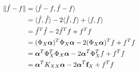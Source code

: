 \documentclass[twoside]{article} \usepackage{aistats2017}
\newcommand{\ds}[1]{{#1}}
\begin{document}
		\begin{equation}
		\begin{aligned}
			\Vert \hat{f} - f \Vert &= \langle \hat{f} - f, \hat{f} - f \rangle \\
			&= \langle \hat{f}, \hat{f} \rangle - 2 \langle \hat{f}, f \rangle + \langle f, f \rangle \\
			&=  \hat{f}^{T} \hat{f} - 2 \hat{f}^{T} f + f^{T} f \\
			&= (\Phi_{\ds{X}} \bm{\alpha})^{T} \Phi_{\ds{X}}  \bm{\alpha} - 2 (\Phi_{\ds{X}}  \bm{\alpha})^{T} f + f^{T} f \\
			&= \bm{\alpha}^{T} \Phi_{\ds{X}} ^{T} \Phi_{\ds{X}}  \bm{\alpha} - 2 \bm{\alpha}^{T} \Phi_{\ds{X}} ^{T} f + f^{T} f \\
			&= \bm{\alpha}^{T} K_{\ds{X} \ds{X}}  \bm{\alpha} - 2 \bm{\alpha}^{T} \bvec{f}_{\ds{X}} + f^{T} f \\
			\end{aligned}
		\label{eq:approximate_embedding_derivation}
		\end{equation}
\end{document}
